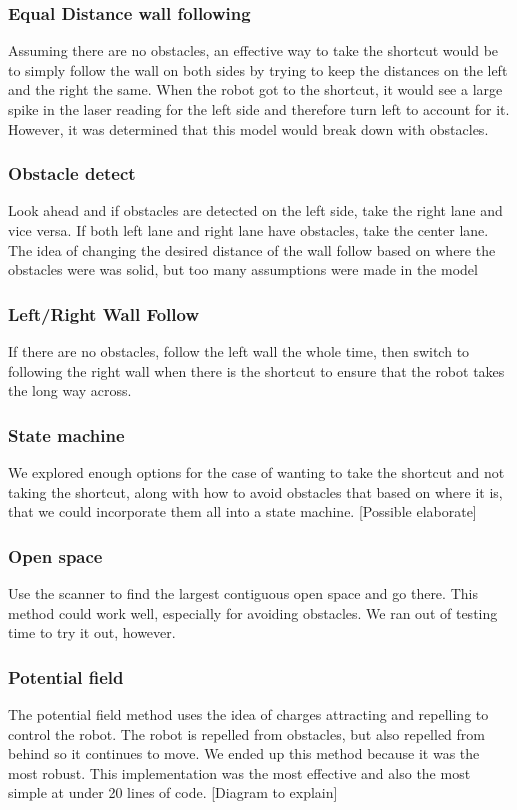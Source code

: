 \documentclass[journal, a4paper]{IEEEtran}
\begin{document}
\subsubsection{Equal Distance wall following}
Assuming there are no obstacles, an effective way to take the shortcut would be to simply follow the wall on both sides by trying to keep the distances on the left and the right the same. When the robot got to the shortcut, it would see a large spike in the laser reading for the left side and therefore turn left to account for it. However, it was determined that this model would break down with obstacles. 
\subsubsection{Obstacle detect}
Look ahead and if obstacles are detected on the left side, take the right lane and vice versa. If both left lane and right lane have obstacles, take the center lane. The idea of changing the desired distance of the wall follow based on where the obstacles were was solid, but too many assumptions were made in the model
\subsubsection{Left/Right Wall Follow}
If there are no obstacles, follow the left wall the whole time, then switch to following the right wall when there is the shortcut to ensure that the robot takes the long way across.
\subsubsection{State machine}
We explored enough options for the case of wanting to take the shortcut and not taking the shortcut, along with how to avoid obstacles that based on where it is, that we could incorporate them all into a state machine. [Possible elaborate]
\subsubsection{Open space}
Use the scanner to find the largest contiguous open space and go there. This method could work well, especially for avoiding obstacles. We ran out of testing time to try it out, however. 
\subsubsection{Potential field}
The potential field method uses the idea of charges attracting and repelling to control the robot. The robot is repelled from obstacles, but also repelled from behind so it continues to move. We ended up this method because it was the most robust. This implementation was the most effective and also the most simple at under 20 lines of code. [Diagram to explain]
\end{document}
